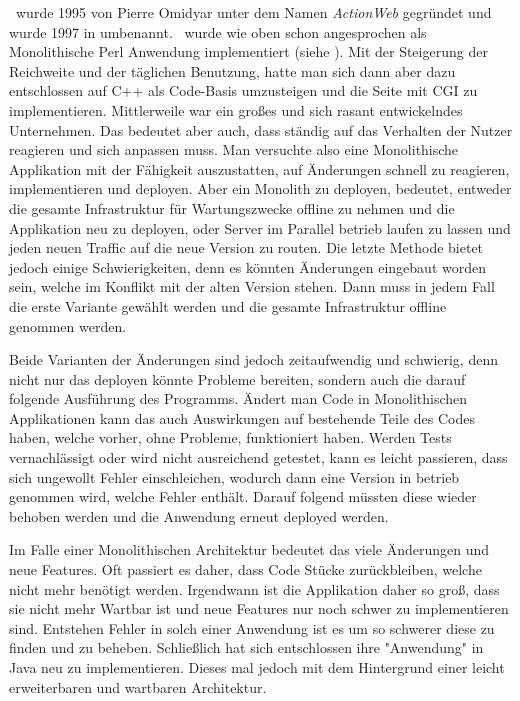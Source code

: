 \ebay\ wurde 1995 von Pierre Omidyar unter dem Namen \textit{ActionWeb} gegründet und wurde 1997 in \ebay umbenannt. \ebay\ wurde wie oben schon angesprochen als Monolithische Perl Anwendung implementiert (siehe \cite{wiki:ebay}). Mit der Steigerung der Reichweite und der täglichen Benutzung, hatte man sich dann aber dazu entschlossen auf C++ als Code-Basis umzusteigen und die Seite mit CGI zu implementieren. Mittlerweile war \ebay ein großes und sich rasant entwickelndes Unternehmen. Das bedeutet aber auch, dass \ebay ständig auf das Verhalten der Nutzer reagieren und sich anpassen muss. Man versuchte also eine Monolithische Applikation mit der Fähigkeit auszustatten, auf Änderungen schnell zu reagieren, implementieren und deployen. Aber ein Monolith zu deployen, bedeutet, entweder die gesamte Infrastruktur für Wartungszwecke offline zu nehmen und die Applikation neu zu deployen, oder Server im Parallel betrieb laufen zu lassen und jeden neuen Traffic auf die neue Version zu routen. Die letzte Methode bietet jedoch einige Schwierigkeiten, denn es könnten Änderungen eingebaut worden sein, welche im Konflikt mit der alten Version stehen. Dann muss in jedem Fall die erste Variante gewählt werden und die gesamte Infrastruktur offline genommen werden.

Beide Varianten der Änderungen sind jedoch zeitaufwendig und  schwierig, denn nicht nur das deployen könnte Probleme bereiten, sondern auch die darauf folgende Ausführung des Programms. Ändert man Code in Monolithischen Applikationen kann das auch Auswirkungen auf bestehende Teile des Codes haben, welche vorher, ohne Probleme, funktioniert haben. Werden Tests vernachlässigt oder wird nicht ausreichend getestet, kann es leicht passieren, dass sich ungewollt Fehler einschleichen, wodurch dann eine Version in betrieb genommen wird, welche Fehler enthält. Darauf folgend müssten diese wieder behoben werden und die Anwendung erneut deployed werden.

Im Falle einer Monolithischen Architektur bedeutet das viele Änderungen und neue Features. Oft passiert es daher, dass Code Stücke zurückbleiben, welche nicht mehr benötigt werden. Irgendwann ist die Applikation daher so groß, dass sie nicht mehr Wartbar ist und neue Features nur noch schwer zu implementieren sind. Entstehen Fehler in solch einer Anwendung ist es um so schwerer diese zu finden und zu beheben. Schließlich hat sich \ebay entschlossen ihre "Anwendung" in Java neu zu implementieren. Dieses mal jedoch mit dem Hintergrund einer leicht erweiterbaren und wartbaren Architektur.

